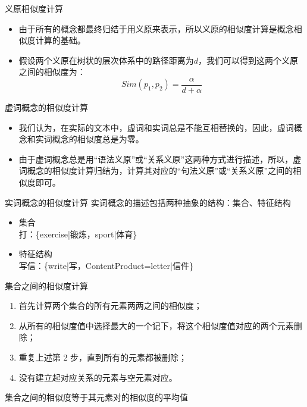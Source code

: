 \documentclass{beamer}
\begin{document}
    \begin{frame}{义原相似度计算}
      \begin{itemize}
        \item 由于所有的概念都最终归结于用义原来表示，所以义原的相似度计算是概念相似度计算的基础。
        \item 假设两个义原在树状的层次体系中的路径距离为$d$，我们可以得到这两个义原之间的相似度为：
        \begin{equation}
          Sim(p_1, p_2) = \frac{\alpha}{d + \alpha}
        \end{equation}
      \end{itemize}
    \end{frame}

    \begin{frame}{虚词概念的相似度计算}
      \begin{itemize}
        \item 我们认为，在实际的文本中，虚词和实词总是不能互相替换的，因此，虚词概念和实词概念的相似度总是为零。
        \item 由于虚词概念总是用“语法义原”或“关系义原”这两种方式进行描述，所以，虚词概念的相似度计算归结为，计算其对应的“句法义原”或“关系义原”之间的相似度即可。
      \end{itemize}
    \end{frame}

    \begin{frame}{实词概念的相似度计算}
      实词概念的描述包括两种抽象的结构：集合、特征结构
      \begin{itemize}
        \item 集合 \\
          打：\{exercise|锻炼，sport|体育\}
        \item 特征结构 \\
          写信：\{write|写，ContentProduct=letter|信件\}
      \end{itemize}
    \end{frame}

    \begin{frame}{集合之间的相似度计算}
      \begin{enumerate}
        \item 首先计算两个集合的所有元素两两之间的相似度；
        \item 从所有的相似度值中选择最大的一个记下，将这个相似度值对应的两个元素删除；
        \item 重复上述第 2 步，直到所有的元素都被删除；
        \item 没有建立起对应关系的元素与空元素对应。 
      \end{enumerate}
      集合之间的相似度等于其元素对的相似度的平均值
    \end{frame}
\end{document}
